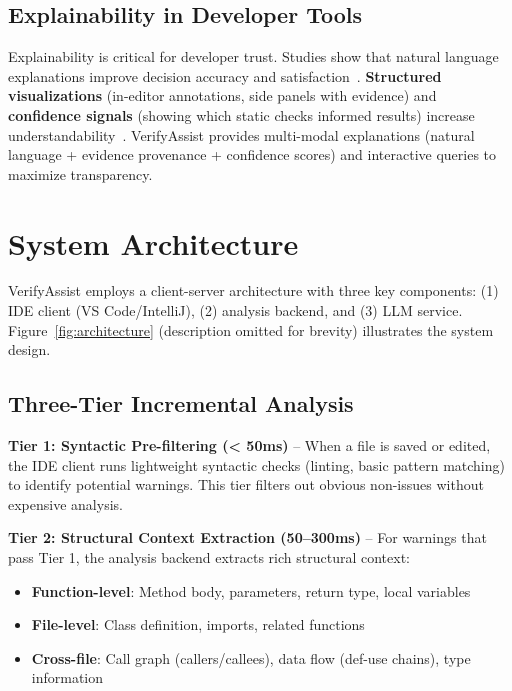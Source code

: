\documentclass[conference]{IEEEtran}
\begin{document}
\subsection{Explainability in Developer Tools}

Explainability is critical for developer trust. Studies show that natural language explanations improve decision accuracy and satisfaction~\cite{kang2024explainable, yan2024better}. \textbf{Structured visualizations} (in-editor annotations, side panels with evidence) and \textbf{confidence signals} (showing which static checks informed results) increase understandability~\cite{beigelbeck2021interactive}. VerifyAssist provides multi-modal explanations (natural language + evidence provenance + confidence scores) and interactive queries to maximize transparency.

\section{System Architecture}

VerifyAssist employs a client-server architecture with three key components: (1) IDE client (VS Code/IntelliJ), (2) analysis backend, and (3) LLM service. Figure~\ref{fig:architecture} (description omitted for brevity) illustrates the system design.

\subsection{Three-Tier Incremental Analysis}

\textbf{Tier 1: Syntactic Pre-filtering (< 50ms)} -- When a file is saved or edited, the IDE client runs lightweight syntactic checks (linting, basic pattern matching) to identify potential warnings. This tier filters out obvious non-issues without expensive analysis.

\textbf{Tier 2: Structural Context Extraction (50--300ms)} -- For warnings that pass Tier 1, the analysis backend extracts rich structural context:
\begin{itemize}
\item \textbf{Function-level}: Method body, parameters, return type, local variables
\item \textbf{File-level}: Class definition, imports, related functions
\item \textbf{Cross-file}: Call graph (callers/callees), data flow (def-use chains), type information
\end{itemize}
\end{document}
